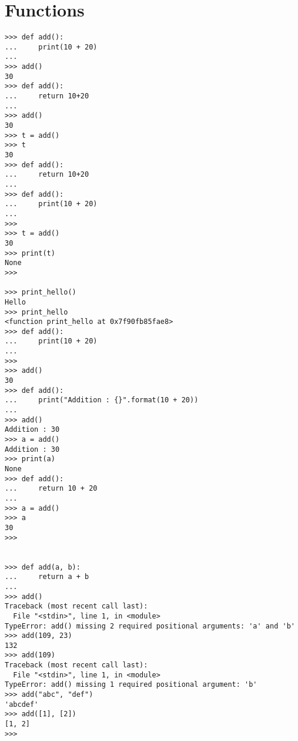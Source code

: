 \documentclass[letterpaper,12pt]{book}
\begin{document}
\section{Functions}
\begin{verbatim}
>>> def add():
...     print(10 + 20)
... 
>>> add()
30
>>> def add():
...     return 10+20
... 
>>> add()
30
>>> t = add()
>>> t
30
>>> def add():
...     return 10+20
... 
>>> def add():
...     print(10 + 20)
... 
>>> 
>>> t = add()
30
>>> print(t)
None
>>> 

>>> print_hello()
Hello
>>> print_hello
<function print_hello at 0x7f90fb85fae8>
>>> def add():
...     print(10 + 20)
... 
>>> 
>>> add()
30
>>> def add():
...     print("Addition : {}".format(10 + 20))
... 
>>> add()
Addition : 30
>>> a = add()
Addition : 30
>>> print(a)
None
>>> def add():
...     return 10 + 20
... 
>>> a = add()
>>> a
30
>>> 


>>> def add(a, b):
...     return a + b
... 
>>> add()
Traceback (most recent call last):
  File "<stdin>", line 1, in <module>
TypeError: add() missing 2 required positional arguments: 'a' and 'b'
>>> add(109, 23)
132
>>> add(109)
Traceback (most recent call last):
  File "<stdin>", line 1, in <module>
TypeError: add() missing 1 required positional argument: 'b'
>>> add("abc", "def")
'abcdef'
>>> add([1], [2])
[1, 2]
>>> 
\end{verbatim}
\end{document}
